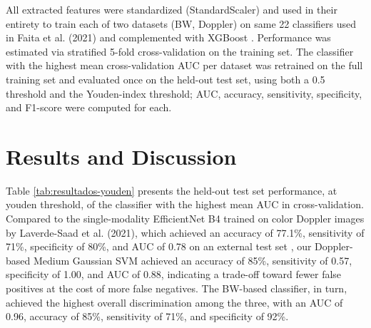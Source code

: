 \documentclass[12pt]{article}
\begin{document}
All extracted features were standardized (StandardScaler) and used in their entirety to train each of two datasets (BW, Doppler) on same 22 classifiers used in Faita et al. (2021) and complemented with XGBoost \cite{Faita2022}. Performance was estimated via stratified 5-fold cross-validation on the training set. The classifier with the highest mean cross-validation AUC per dataset was retrained on the full training set and evaluated once on the held-out test set, using both a 0.5 threshold and the Youden-index threshold; AUC, accuracy, sensitivity, specificity, and F1-score were computed for each.

\section{Results and Discussion}

Table \ref{tab:resultados-youden} presents the held-out test set performance, at youden threshold, of the classifier with the highest mean AUC in cross-validation. Compared to the single-modality EfficientNet B4 trained on color Doppler images by Laverde-Saad et al. (2021), which achieved an accuracy of 77.1\%, sensitivity of 71\%, specificity of 80\%, and AUC of 0.78 on an external test set \cite{LaverdeSaad2021}, our Doppler-based Medium Gaussian SVM achieved an accuracy of 85\%, sensitivity of 0.57, specificity of 1.00, and AUC of 0.88, indicating a trade-off toward fewer false positives at the cost of more false negatives. The BW-based classifier, in turn, achieved the highest overall discrimination among the three, with an AUC of 0.96, accuracy of 85\%, sensitivity of 71\%, and specificity of 92\%.

\begin{table}[ht]
    \centering
        \caption{Performance of the best classifiers per dataset in youden threshold (on the test data) - Tracks A and B}
        \label{tab:resultados-youden}
\end{table}
\end{document}
